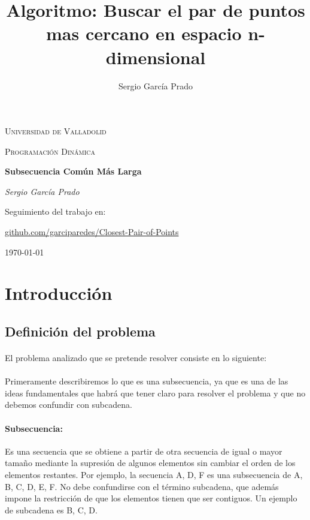 \documentclass{article}
\title{Algoritmo: Buscar el par de puntos mas cercano en espacio n-dimensional}
\author{Sergio García Prado}
\begin{document}
\begin{titlepage}
	\centering
	{\scshape\LARGE Universidad de Valladolid \par}
	\vspace{1cm}
	{\scshape\Large Programación Dinámica\par}
	\vspace{1.5cm}
	{\huge\bfseries Subsecuencia Común Más Larga\par}
	\vspace{2cm}
	{\Large\itshape Sergio García Prado\par}
	
	\vfill
	Seguimiento del trabajo en: \par
	\href{https://github.com/garciparedes/Closest-Pair-of-Points}{github.com/garciparedes/Closest-Pair-of-Points}

	\vfill


	{\large \today\par}
\end{titlepage}

\section{Introducción}
	
	\subsection{Definición del problema}
	
		\paragraph{}
		El problema analizado que se pretende resolver consiste en lo siguiente:
		
		\paragraph{}
		Primeramente describiremos lo que es una subsecuencia, ya que es una de las ideas fundamentales que habrá que tener claro para resolver el problema y que no debemos confundir con subcadena.
		
		\paragraph{Subsecuencia:}
		Es una secuencia que se obtiene a partir de otra secuencia de igual o mayor tamaño mediante la supresión de algunos elementos sin cambiar el orden de los elementos restantes. Por ejemplo, la secuencia A, D, F es una subsecuencia de A, B, C, D, E, F. 
		\newline
		No debe confundirse con el término subcadena, que además impone la restricción de que los elementos tienen que ser contiguos. Un ejemplo de subcadena es B, C, D.
		
\end{document}

